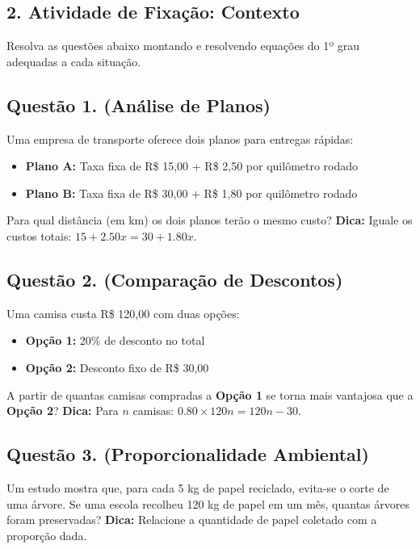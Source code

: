 \documentclass[11pt]{article}
\begin{document}
\begin{multicols}{2}
\section*{2. Atividade de Fixação: Contexto}

Resolva as questões abaixo montando e resolvendo equações do 1º grau adequadas a cada situação.

\subsection*{Questão 1. (Análise de Planos)}
Uma empresa de transporte oferece dois planos para entregas rápidas:  
\begin{itemize}
    \item \textbf{Plano A:} Taxa fixa de R\$ 15,00 + R\$ 2,50 por quilômetro rodado
    \item \textbf{Plano B:} Taxa fixa de R\$ 30,00 + R\$ 1,80 por quilômetro rodado
\end{itemize}
Para qual distância (em km) os dois planos terão o mesmo custo?
\textbf{Dica:} Iguale os custos totais: \(15 + 2.50x = 30 + 1.80x\).


\subsection*{Questão 2. (Comparação de Descontos)}
Uma camisa custa R\$ 120,00 com duas opções:

\begin{itemize}[noitemsep]
    \item \textbf{Opção 1:} 20\% de desconto no total
    \item \textbf{Opção 2:} Desconto fixo de R\$ 30,00
\end{itemize}
A partir de quantas camisas compradas a \textbf{Opção 1} se torna mais vantajosa que a \textbf{Opção 2}?
\textbf{Dica:} Para \(n\) camisas: \(0.80 \times 120n = 120n - 30\).

\subsection*{Questão 3. (Proporcionalidade Ambiental)}
Um estudo mostra que, para cada 5 kg de papel reciclado, evita-se o corte de uma árvore. Se uma escola recolheu 120 kg de papel em um mês, quantas árvores foram preservadas?
\textbf{Dica:} Relacione a quantidade de papel coletado com a proporção dada.


\end{multicols}
\end{document}
